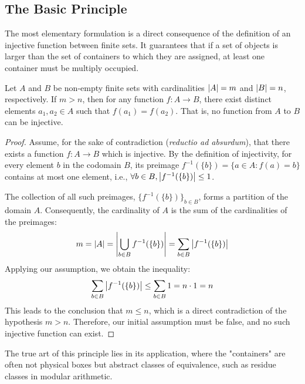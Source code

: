 \subsection{The Basic Principle}

The most elementary formulation is a direct consequence of the definition of an injective function between finite sets. It guarantees that if a set of objects is larger than the set of containers to which they are assigned, at least one container must be multiply occupied.

\begin{theorem}\label{thm:pigeonhole_basic}
Let $A$ and $B$ be non-empty finite sets with cardinalities $\left| A \right| = m$ and $\left| B \right| = n$, respectively. If $m > n$, then for any function $f: A \to B$, there exist distinct elements $a_1, a_2 \in A$ such that $f(a_1) = f(a_2)$. That is, no function from $A$ to $B$ can be injective.
\end{theorem}
\begin{proof}
Assume, for the sake of contradiction (\textit{reductio ad absurdum}), that there exists a function $f: A \to B$ which is injective. By the definition of injectivity, for every element $b$ in the codomain $B$, its preimage $f^{-1}(\{b\}) = \{a \in A : f(a)=b\}$ contains at most one element, i.e., $\forall b \in B, \left| f^{-1}(\{b\}) \right| \le 1$.

The collection of all such preimages, $\{f^{-1}(\{b\})\}_{b \in B}$, forms a partition of the domain $A$. Consequently, the cardinality of $A$ is the sum of the cardinalities of the preimages:
$$ m = \left| A \right| = \left| \bigcup_{b \in B} f^{-1}(\{b\}) \right| = \sum_{b \in B} \left| f^{-1}(\{b\}) \right| $$
Applying our assumption, we obtain the inequality:
$$ \sum_{b \in B} \left| f^{-1}(\{b\}) \right| \le \sum_{b \in B} 1 = n \cdot 1 = n $$
This leads to the conclusion that $m \le n$, which is a direct contradiction of the hypothesis $m > n$. Therefore, our initial assumption must be false, and no such injective function can exist.
\end{proof}

The true art of this principle lies in its application, where the "containers" are often not physical boxes but abstract classes of equivalence, such as residue classes in modular arithmetic.

